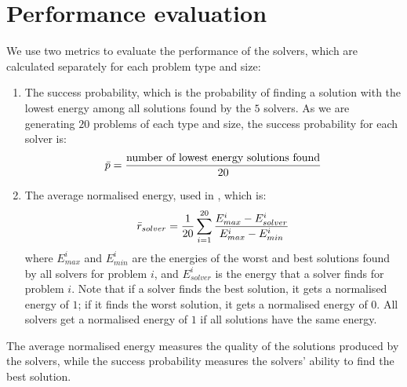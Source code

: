 

\section{Performance evaluation}
We use two metrics to evaluate the performance of the solvers, which are calculated separately for each problem type and size:
\begin{enumerate}
    \item The success probability, which is the probability of finding a solution with the lowest energy among all solutions found by the $5$ solvers. As we are generating $20$ problems of each type and size, the success probability for each solver is:
    \begin{equation}
        \Bar{p} = \frac{\text{number of lowest energy solutions found}}{20}
    \end{equation}
    \item The average normalised energy, used in \cite{b34}, which is:
    \begin{equation}
        \Bar{r}_{solver} =  \frac{1}{20} \sum_{i = 1}^{20} \frac{E^i_{max} - E^i_{solver}}{E^i_{max} - E^i_{min}}
    \end{equation}
    where $E^i_{max}$ and $E^i_{min}$ are the energies of the worst and best solutions found by all solvers for problem $i$, and $E^i_{solver}$ is the energy that a solver finds for problem $i$. Note that if a solver finds the best solution, it gets a normalised energy of $1$; if it finds the worst solution, it gets a normalised energy of $0$. All solvers get a normalised energy of $1$ if all solutions have the same energy.
\end{enumerate}
The average normalised energy measures the quality of the solutions produced by the solvers, while the success probability measures the solvers' ability to find the best solution.